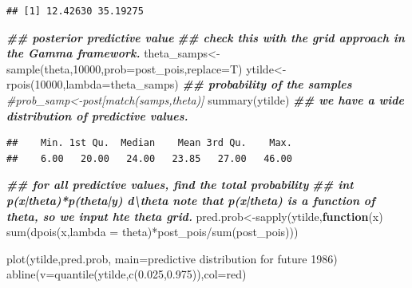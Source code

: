 \documentclass[
]{book}
\newenvironment{Shaded}{\begin{snugshade}}{\end{snugshade}}
\newcommand{\AttributeTok}[1]{\textcolor[rgb]{0.77,0.63,0.00}{#1}}
\newcommand{\CommentTok}[1]{\textcolor[rgb]{0.56,0.35,0.01}{\textit{#1}}}
\newcommand{\ControlFlowTok}[1]{\textcolor[rgb]{0.13,0.29,0.53}{\textbf{#1}}}
\newcommand{\DecValTok}[1]{\textcolor[rgb]{0.00,0.00,0.81}{#1}}
\newcommand{\DocumentationTok}[1]{\textcolor[rgb]{0.56,0.35,0.01}{\textbf{\textit{#1}}}}
\newcommand{\FloatTok}[1]{\textcolor[rgb]{0.00,0.00,0.81}{#1}}
\newcommand{\FunctionTok}[1]{\textcolor[rgb]{0.00,0.00,0.00}{#1}}
\newcommand{\NormalTok}[1]{#1}
\newcommand{\OtherTok}[1]{\textcolor[rgb]{0.56,0.35,0.01}{#1}}
\newcommand{\SpecialCharTok}[1]{\textcolor[rgb]{0.00,0.00,0.00}{#1}}
\newcommand{\StringTok}[1]{\textcolor[rgb]{0.31,0.60,0.02}{#1}}
\theoremstyle{definition}
\theoremstyle{definition}
\theoremstyle{definition}
\theoremstyle{definition}
\theoremstyle{remark}
\begin{document}
\begin{verbatim}
## [1] 12.42630 35.19275
\end{verbatim}

\begin{Shaded}
\begin{Highlighting}[]
\DocumentationTok{\#\# posterior predictive value}
   \DocumentationTok{\#\# check this with the grid approach in the Gamma framework.  }
\NormalTok{  theta\_samps}\OtherTok{\textless{}{-}}\FunctionTok{sample}\NormalTok{(theta,}\DecValTok{10000}\NormalTok{,}\AttributeTok{prob=}\NormalTok{post\_pois,}\AttributeTok{replace=}\NormalTok{T)}
\NormalTok{   ytilde}\OtherTok{\textless{}{-}}\FunctionTok{rpois}\NormalTok{(}\DecValTok{10000}\NormalTok{,}\AttributeTok{lambda=}\NormalTok{theta\_samps) }
 \DocumentationTok{\#\# probability of the samples }
 \CommentTok{\#prob\_samp\textless{}{-}post[match(samps,theta)]}
  \FunctionTok{summary}\NormalTok{(ytilde) }\DocumentationTok{\#\# we have a wide distribution of predictive values.}
\end{Highlighting}
\end{Shaded}

\begin{verbatim}
##    Min. 1st Qu.  Median    Mean 3rd Qu.    Max. 
##    6.00   20.00   24.00   23.85   27.00   46.00
\end{verbatim}

\begin{Shaded}
\begin{Highlighting}[]
\DocumentationTok{\#\# for all predictive values,  find the total probability  }
   \DocumentationTok{\#\# int p(x|theta)*p(theta|y) d\textbackslash{}theta  note that p(x|theta) is a function of theta, so we input hte theta grid.}
\NormalTok{ pred.prob}\OtherTok{\textless{}{-}}\FunctionTok{sapply}\NormalTok{(ytilde,}\ControlFlowTok{function}\NormalTok{(x) }\FunctionTok{sum}\NormalTok{(}\FunctionTok{dpois}\NormalTok{(x,}\AttributeTok{lambda =}\NormalTok{ theta)}\SpecialCharTok{*}\NormalTok{post\_pois}\SpecialCharTok{/}\FunctionTok{sum}\NormalTok{(post\_pois)))  }
  
 \FunctionTok{plot}\NormalTok{(ytilde,pred.prob, }\AttributeTok{main=}\StringTok{\textquotesingle{}predictive distribution for future 1986\textquotesingle{}}\NormalTok{)}
 \FunctionTok{abline}\NormalTok{(}\AttributeTok{v=}\FunctionTok{quantile}\NormalTok{(ytilde,}\FunctionTok{c}\NormalTok{(}\FloatTok{0.025}\NormalTok{,}\FloatTok{0.975}\NormalTok{)),}\AttributeTok{col=}\StringTok{\textquotesingle{}red\textquotesingle{}}\NormalTok{)}
\end{Highlighting}
\end{Shaded}
\end{document}
